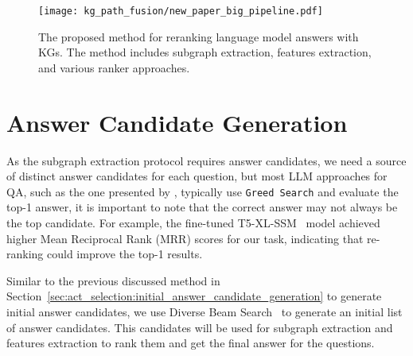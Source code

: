 \begin{figure}[htb]
    \centering
    \texttt{[image: kg\_path\_fusion/new\_paper\_big\_pipeline.pdf]}
    \caption{The proposed method for reranking language model answers with KGs. The method includes subgraph extraction, features extraction, and various ranker approaches.}
    \label{fig:controllable_fusion:big_pipe}    
\end{figure}

\section{Answer Candidate Generation}
\label{sec:controllable_fusion:answer_candidate_generation}

As the subgraph extraction protocol requires answer candidates, we need a source of distinct answer candidates for each question, but most LLM approaches for QA, such as the one presented by \cite{DBLP:conf/coling/SenAS22-mintaka}, typically use \texttt{Greed Search} and evaluate the top-1 answer, it is important to note that the correct answer may not always be the top candidate. For example, the fine-tuned T5-XL-SSM~\cite{DBLP:conf/emnlp/RobertsRS20} model achieved higher Mean Reciprocal Rank (MRR) scores for our task, indicating that re-ranking could improve the top-1 results. 

Similar to the previous discussed method in Section~\ref{sec:act_selection:initial_answer_candidate_generation} to generate initial answer candidates, we use Diverse Beam Search~\cite{DBLP:journals/corr/VijayakumarCSSL16-diverse-beam-search} to generate an initial list of answer candidates. This candidates will be used for subgraph extraction and features extraction to rank them and get the final answer for the questions.
  



